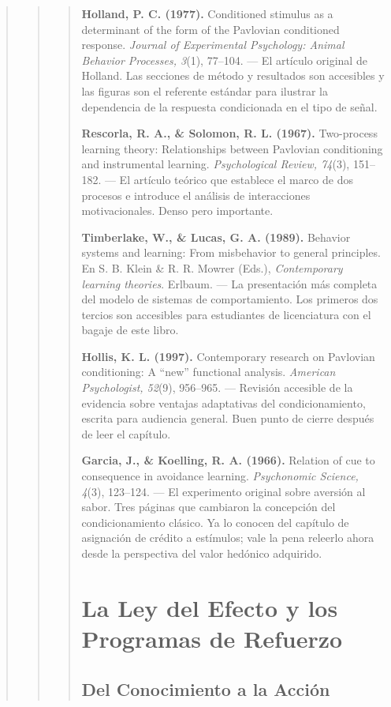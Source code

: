 \documentclass[
  letterpaper,
  DIV=11,
  numbers=noendperiod]{scrreprt}
\begin{document}
\begin{tcolorbox}[enhanced jigsaw, toprule=.15mm, arc=.35mm, colback=white, opacityback=0, colframe=quarto-callout-note-color-frame, breakable, rightrule=.15mm, left=2mm, leftrule=.75mm, bottomrule=.15mm]
\begin{quote}
\begin{quote}
\begin{quote}
\textbf{Holland, P. C. (1977).} Conditioned stimulus as a determinant of
the form of the Pavlovian conditioned response. \emph{Journal of
Experimental Psychology: Animal Behavior Processes, 3}(1), 77--104. ---
El artículo original de Holland. Las secciones de método y resultados
son accesibles y las figuras son el referente estándar para ilustrar la
dependencia de la respuesta condicionada en el tipo de señal.

\textbf{Rescorla, R. A., \& Solomon, R. L. (1967).} Two-process learning
theory: Relationships between Pavlovian conditioning and instrumental
learning. \emph{Psychological Review, 74}(3), 151--182. --- El artículo
teórico que establece el marco de dos procesos e introduce el análisis
de interacciones motivacionales. Denso pero importante.

\textbf{Timberlake, W., \& Lucas, G. A. (1989).} Behavior systems and
learning: From misbehavior to general principles. En S. B. Klein \& R.
R. Mowrer (Eds.), \emph{Contemporary learning theories}. Erlbaum. --- La
presentación más completa del modelo de sistemas de comportamiento. Los
primeros dos tercios son accesibles para estudiantes de licenciatura con
el bagaje de este libro.

\textbf{Hollis, K. L. (1997).} Contemporary research on Pavlovian
conditioning: A ``new'' functional analysis. \emph{American
Psychologist, 52}(9), 956--965. --- Revisión accesible de la evidencia
sobre ventajas adaptativas del condicionamiento, escrita para audiencia
general. Buen punto de cierre después de leer el capítulo.

\textbf{Garcia, J., \& Koelling, R. A. (1966).} Relation of cue to
consequence in avoidance learning. \emph{Psychonomic Science, 4}(3),
123--124. --- El experimento original sobre aversión al sabor. Tres
páginas que cambiaron la concepción del condicionamiento clásico. Ya lo
conocen del capítulo de asignación de crédito a estímulos; vale la pena
releerlo ahora desde la perspectiva del valor hedónico adquirido.


\chapter{La Ley del Efecto y los Programas de
Refuerzo}\label{la-ley-del-efecto-y-los-programas-de-refuerzo}

\section{Del Conocimiento a la
Acción}\label{del-conocimiento-a-la-acciuxf3n}


\end{quote}
\end{quote}
\end{quote}
\end{tcolorbox}
\end{document}
